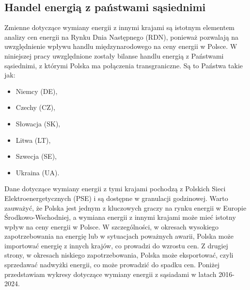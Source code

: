 \subsection{Handel energią z państwami sąsiednimi}
\label{subsec:trade}
Zmienne dotyczące wymiany energii z innymi krajami są istotnym elementem analizy cen energii na Rynku Dnia Następnego (RDN), ponieważ pozwalają na uwzględnienie wpływu handlu międzynarodowego na ceny energii w Polsce. W niniejszej pracy uwzględnione zostały bilanse handlu energią z Państwami sąsiednimi, z którymi Polska ma połączenia transgraniczne. Są to Państwa takie jak:
\begin{itemize}
    \item Niemcy (DE),
    \item Czechy (CZ),
    \item Słowacja (SK),
    \item Litwa (LT),
    \item Szwecja (SE),
    \item Ukraina (UA).
\end{itemize}

Dane dotyczące wymiany energii z tymi krajami pochodzą z Polskich Sieci Elektroenergetycznych (PSE) i są dostępne w granulacji godzinowej. Warto zauważyć, że Polska jest jednym z kluczowych graczy na rynku energii w Europie Środkowo-Wschodniej, a wymiana energii z innymi krajami może mieć istotny wpływ na ceny energii w Polsce. W szczególności, w okresach wysokiego zapotrzebowania na energię lub w sytuacjach poważnych awarii, Polska może importować energię z innych krajów, co prowadzi do wzrostu cen. Z drugiej strony, w okresach niskiego zapotrzebowania, Polska może eksportować, czyli sprzedawać nadwyżki energii, co może prowadzić do spadku cen. Poniżej przedstawiam wykresy dotyczące wymiany energii z sąsiadami w latach 2016-2024.

